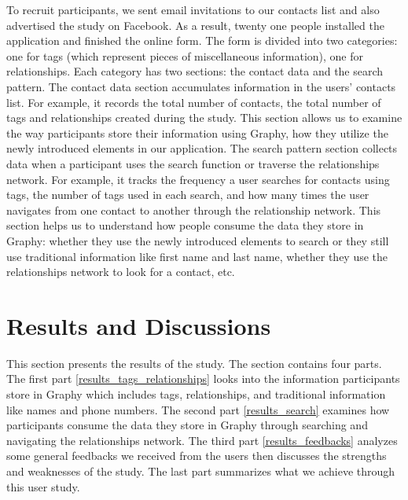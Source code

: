 To recruit participants, we sent email invitations to our contacts list and also advertised the study on Facebook. As a result, twenty one people installed the application and finished the online form. The form is divided into two categories: one for tags (which represent pieces of miscellaneous information), one for relationships. Each category has two sections: the contact data and the search pattern. The contact data section accumulates information in the users' contacts list. For example, it records the total number of contacts, the total number of tags and relationships created during the study. This section allows us to examine the way participants store their information using Graphy, how they utilize the newly introduced elements in our application. The search pattern section collects data when a participant uses the search function or traverse the relationships network. For example, it tracks the frequency a user searches for contacts using tags, the number of tags used in each search, and how many times the user navigates from one contact to another through the relationship network. This section helps us to understand how people consume the data they store in Graphy: whether they use the newly introduced elements to search or they still use traditional information like first name and last name, whether they use the relationships network to look for a contact, etc.
\section{Results and Discussions}
This section presents the results of the study. The section contains four parts. The first part \textit{} \ref{results_tags_relationships} looks into the information participants store in Graphy which includes tags, relationships, and traditional information like names and phone numbers. The second part \textit{} \ref{results_search} examines how participants consume the data they store in Graphy through searching and navigating the relationships network. The third part \textit{} \ref{results_feedbacks} analyzes some general feedbacks we received from the users then discusses the strengths and weaknesses of the study. The last part summarizes what we achieve through this user study.
